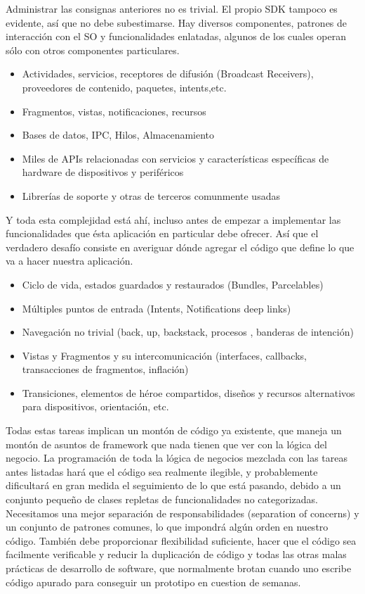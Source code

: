 Administrar las consignas anteriores no es trivial. El propio SDK tampoco es evidente, así que no debe subestimarse. Hay diversos componentes, patrones de interacción con el SO y funcionalidades enlatadas, algunos de los cuales operan sólo con otros componentes particulares.

\begin{itemize}
	\item Actividades, servicios, receptores de difusión (Broadcast Receivers), proveedores de contenido, paquetes, intents,etc.
	\item Fragmentos, vistas, notificaciones, recursos
	\item Bases de datos, IPC, Hilos, Almacenamiento
	\item Miles de APIs relacionadas con servicios y características específicas de hardware de dispositivos y periféricos
	\item Librerías de soporte y otras de terceros comunmente usadas
	
\end{itemize}

Y toda esta complejidad está ahí, incluso antes de empezar a implementar las funcionalidades que ésta aplicación en particular debe ofrecer. Así que el verdadero desafío consiste en averiguar dónde agregar el código que define lo que va a hacer nuestra aplicación.

\begin{itemize}
	\item Ciclo de vida, estados guardados y restaurados (Bundles, Parcelables)
	\item Múltiples puntos de entrada (Intents, Notifications deep links)
	\item Navegación no trivial (back, up, backstack, procesos , banderas de intención)
	\item Vistas y Fragmentos y su intercomunicación (interfaces, callbacks, transacciones de fragmentos, inflación)
	\item Transiciones, elementos de héroe compartidos, diseños y recursos alternativos para dispositivos, orientación, etc.
	
\end{itemize}

Todas estas tareas implican un montón de código ya existente, que maneja un montón de asuntos de framework que nada tienen que ver con la lógica del negocio. La programación de toda la lógica de negocios mezclada con las tareas antes listadas hará que el código sea realmente ilegible, y probablemente dificultará en gran medida el  seguimiento de lo que está pasando, debido a un conjunto pequeño de clases repletas de funcionalidades no categorizadas. Necesitamos una mejor separación de responsabilidades (separation of concerns) y un conjunto de patrones comunes, lo que impondrá algún orden en nuestro código. También debe proporcionar flexibilidad suficiente, hacer que el código sea facilmente verificable y reducir la duplicación de código y todas las otras malas prácticas de desarrollo de software, que normalmente brotan cuando uno escribe código apurado para conseguir un prototipo en cuestion de semanas.